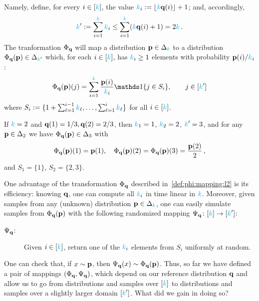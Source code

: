 Namely, define, for every $i \in [{\textcolor{cyan}{k}}]$, the value $\ab_i \eqdef \flr{ \ab\q(i) } + 1$; and, accordingly, 
\begin{equation}
	\label{def:phi:mapping:l2:domain}
	{\textcolor{cyan}{k}}' := \sum_{i=1}^{\textcolor{cyan}{k}} {\textcolor{cyan}{k}}_i \leq \sum_{i=1}^{\textcolor{cyan}{k}} ({\textcolor{cyan}{k}}\mathbf{q}(i) + 1) = 2{\textcolor{cyan}{k}}\,.
\end{equation}
The tranformation $\Phi_{\mathbf{q}}$ will map a distribution $\mathbf{p}\in\Delta_{{\textcolor{cyan}{k}}}$ to a distribution $\Phi_{\mathbf{q}}(\mathbf{p})\in\Delta_{{\textcolor{cyan}{k}}'}$ which, for each $i\in[{\textcolor{cyan}{k}}]$, has ${\textcolor{cyan}{k}}_i \geq 1$ elements with probability $\mathbf{p}(i)/{\textcolor{cyan}{k}}_i$:
\begin{equation}
	\label{def:phi:mapping:l2}
	\Phi_\q(\p)(j) = \sum_{i=1}^\ab \frac{\p(i)}{\ab_i} \indic{ j\in S_i }, \qquad j \in [\ab']
\end{equation}
where $S_i := \{ 1+\sum_{\ell=1}^{i-1} {\textcolor{cyan}{k}}_\ell,\dots, \sum_{\ell=1}^i {\textcolor{cyan}{k}}_\ell \}$ for all $i\in[{\textcolor{cyan}{k}}]$.
\begin{example}
If ${\textcolor{cyan}{k}}=2$ and $\mathbf{q}(1)=1/3, \mathbf{q}(2)=2/3$, then ${\textcolor{cyan}{k}}_1 = 1$, ${\textcolor{cyan}{k}}_2 = 2$, ${\textcolor{cyan}{k}}'=3$, and for any $\mathbf{p}\in\Delta_{2}$ we have $\Phi_{\mathbf{q}}(\mathbf{p})\in\Delta_{3}$ with
\[
	\Phi_{\mathbf{q}}(\mathbf{p})(1) = \mathbf{p}(1), \quad \Phi_{\mathbf{q}}(\mathbf{p})(2)=\Phi_{\mathbf{q}}(\mathbf{p})(3) = \frac{\mathbf{p}(2)}{2}\,,
\]
and $S_1=\{1\}$, $S_2=\{2,3\}$.
\end{example}
One advantage of the transformation $\Phi_{\mathbf{q}}$ described in~\cref{def:phi:mapping:l2} is its efficiency: knowing $\mathbf{q}$, one can compute all ${\textcolor{cyan}{k}}_i$ in time linear in ${\textcolor{cyan}{k}}$. Moreover, given samples from any (unknown) distribution $\mathbf{p}\in\Delta_{{\textcolor{cyan}{k}}}$, one can easily simulate samples from $\Phi_{\mathbf{q}}(\mathbf{p})$ with the following randomized mapping $\Psi_{\mathbf{q}}\colon[{\textcolor{cyan}{k}}]\to[{\textcolor{cyan}{k}}']$:
\begin{description}
	\item[$\Psi_{\mathbf{q}}$:] Given $i \in [{\textcolor{cyan}{k}}]$, return one of the ${\textcolor{cyan}{k}}_i$ elements from $S_i$ uniformly at random.
\end{description}
One can check that, if $x\sim\mathbf{p}$, then $\Psi_{\mathbf{q}}(x)\sim\Phi_{\mathbf{q}}(\mathbf{p})$. Thus, so far we have defined a pair of mappings $(\Phi_{\mathbf{q}},\Psi_{\mathbf{q}})$, which depend on our reference distribution $\mathbf{q}$ and allow us to go from distributions and samples over $[{\textcolor{cyan}{k}}]$ to distributions and samples over a slightly larger domain $[{\textcolor{cyan}{k}}']$. What did we gain in doing so?


